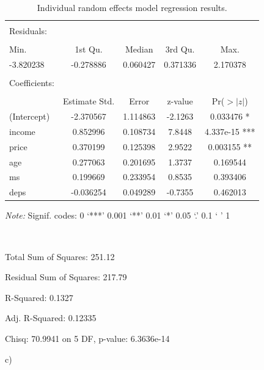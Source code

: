 \documentclass[12pt]{article}
\begin{document}
\begin{table}[!htbp] \centering 
\begin{threeparttable}
  \caption{Individual random effects model regression results.} 
  \label{} 
\begin{tabular}{@{\extracolsep{5pt}}lcccc} 
 \toprule
\midrule
\\
Residuals: \\
\hline \\[-1.8ex]
     Min.  & 1st Qu. &   Median &  3rd Qu.   &   Max. \\
-3.820238 & -0.278886 &  0.060427 &  0.371336 &  2.170378  \\
 \\
Coefficients:  \\
\hline \\[-1.8ex]
    &         Estimate Std. & Error & z-value & Pr($>|z|$)    \\ 
(Intercept) & -2.370567   & 1.114863 & -2.1263 &  0.033476 *   \\
income   &    0.852996  &  0.108734  & 7.8448 & 4.337e-15 *** \\
price    &    0.370199  &  0.125398  & 2.9522  & 0.003155 **  \\
age     &     0.277063  &  0.201695  & 1.3737  & 0.169544     \\
ms      &     0.199669  &  0.233954 &  0.8535  & 0.393406     \\
deps   &     -0.036254 & 0.049289 & -0.7355 & 0.462013   \\
\bottomrule
 \end{tabular}
 \begin{tablenotes}    
\small
\item \textit{Note:} Signif. codes:  0 ‘***’ 0.001 ‘**’ 0.01 ‘*’ 0.05 ‘.’ 0.1 ‘ ’ 1
\item \ 
\item Total Sum of Squares:    251.12
\item Residual Sum of Squares: 217.79
\item R-Squared:      0.1327
\item Adj. R-Squared: 0.12335
\item Chisq: 70.9941 on 5 DF, p-value: 6.3636e-14
\end{tablenotes}
  \end{threeparttable}
\end{table} 


c)
\end{document}
